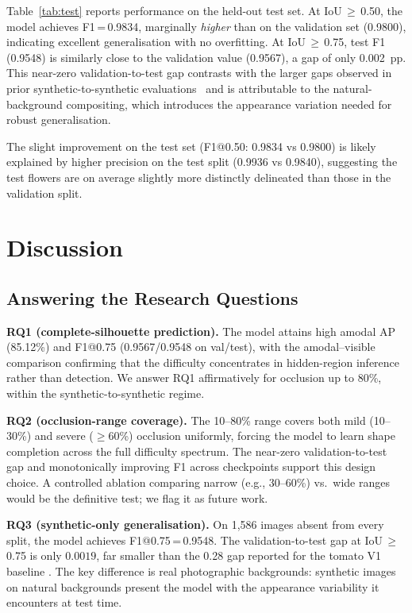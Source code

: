 \documentclass[conference]{IEEEtran}
\begin{document}
Table~\ref{tab:test} reports performance on the held-out test set.
At IoU\,$\geq$\,0.50, the model achieves F1\,=\,0.9834, marginally
\emph{higher} than on the validation set (0.9800), indicating excellent
generalisation with no overfitting.
At IoU\,$\geq$\,0.75, test F1 (0.9548) is similarly close to the
validation value (0.9567), a gap of only 0.002~pp.
This near-zero validation-to-test gap contrasts with the larger gaps
observed in prior synthetic-to-synthetic evaluations~\cite{saadatpour2025tomato}
and is attributable to the natural-background compositing, which introduces
the appearance variation needed for robust generalisation.

The slight improvement on the test set (F1@0.50: 0.9834 vs 0.9800)
is likely explained by higher precision on the test split (0.9936 vs 0.9840),
suggesting the test flowers are on average slightly more distinctly delineated
than those in the validation split.

\section{Discussion}

\subsection{Answering the Research Questions}

\textbf{RQ1 (complete-silhouette prediction).}
The model attains high amodal AP (85.12\%) and F1@0.75 (0.9567/0.9548 on
val/test), with the amodal--visible comparison confirming that the difficulty
concentrates in hidden-region inference rather than detection.
We answer RQ1 affirmatively for occlusion up to 80\%, within the
synthetic-to-synthetic regime.

\textbf{RQ2 (occlusion-range coverage).}
The 10--80\% range covers both mild (10--30\%) and severe ($\geq$60\%)
occlusion uniformly, forcing the model to learn shape completion across
the full difficulty spectrum.
The near-zero validation-to-test gap and monotonically improving F1
across checkpoints support this design choice.
A controlled ablation comparing narrow (e.g., 30--60\%) vs.\ wide ranges
would be the definitive test; we flag it as future work.

\textbf{RQ3 (synthetic-only generalisation).}
On 1{,}586 images absent from every split, the model achieves
F1@0.75\,=\,0.9548.
The validation-to-test gap at IoU\,$\geq$\,0.75 is only $0.0019$, far
smaller than the 0.28 gap reported for the tomato V1 baseline
\cite{saadatpour2025tomato}.
The key difference is real photographic backgrounds: synthetic images on
natural backgrounds present the model with the appearance variability it
encounters at test time.
\end{document}
